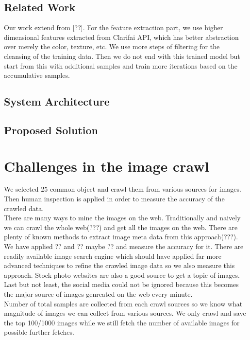 \documentclass[paper=a4, fontsize=11pt]{scrartcl}
\numberwithin{equation}{section}		%
\numberwithin{figure}{section}			%
\numberwithin{table}{section}				%
\begin{document}
\subsection{Related Work}

\noindent Our work extend from [??]. For the feature extraction part, we use higher dimensional features extracted from Clarifai API, which has better abstraction over merely the color, texture, etc. We use more steps of filtering for the cleansing of the training data. Then we do not end with this trained model but start from this with additional samples and train more iterations based on the accumulative samples.

\subsection{System Architecture}

\subsection{Proposed Solution}


\section{Challenges in the image crawl}

We selected 25 common object and crawl them from various sources for images. Then human inspection is applied in order to measure the accuracy of the crawled data.\\

\noindent There are many ways to mine the images on the web. Traditionally and naively we can crawl the whole web(???) and get all the images on the web. There are plenty of known methods to extract image meta data from this approach(???). We have applied ?? and ?? maybe ?? and measure the accuracy for it. There are readily available image search engine which should have applied far more advanced techniques to refine the crawled image data so we also measure this approach. Stock photo websites are also a good source to get a topic of images. Last but not least, the social media could not be ignored because this becomes the major source of images genreated on the web every minute.\\

\noindent Number of total samples are collected from each crawl sources so we know what magnitude of images we can collect from various sources. We only crawl and save the top 100/1000 images while we still fetch the number of available images for possible further fetches.
\end{document}
